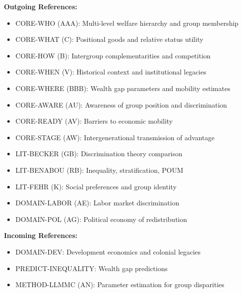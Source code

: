 \begin{tcolorbox}[colback=blue!5!white,colframe=blue!75!black,title=Cross-Reference Map]
\textbf{Outgoing References:}
\begin{itemize}
    \item CORE-WHO (AAA): Multi-level welfare hierarchy and group membership
    \item CORE-WHAT (C): Positional goods and relative status utility
    \item CORE-HOW (B): Intergroup complementarities and competition
    \item CORE-WHEN (V): Historical context and institutional legacies
    \item CORE-WHERE (BBB): Wealth gap parameters and mobility estimates
    \item CORE-AWARE (AU): Awareness of group position and discrimination
    \item CORE-READY (AV): Barriers to economic mobility
    \item CORE-STAGE (AW): Intergenerational transmission of advantage
    \item LIT-BECKER (GB): Discrimination theory comparison
    \item LIT-BENABOU (RB): Inequality, stratification, POUM
    \item LIT-FEHR (K): Social preferences and group identity
    \item DOMAIN-LABOR (AE): Labor market discrimination
    \item DOMAIN-POL (AG): Political economy of redistribution
\end{itemize}

\textbf{Incoming References:}
\begin{itemize}
    \item DOMAIN-DEV: Development economics and colonial legacies
    \item PREDICT-INEQUALITY: Wealth gap predictions
    \item METHOD-LLMMC (AN): Parameter estimation for group disparities
\end{itemize}
\end{tcolorbox}

